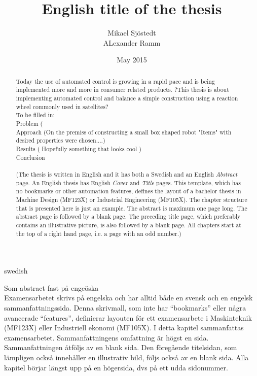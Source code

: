 \documentclass[a4paper,11pt]{kth-mag}
\title{English title of the thesis}
\author{Mikael Sjöstedt \\ ALexander Ramm}
\date{May 2015}
\begin{document}
%
\clearpage

\frontmatter
\pagestyle{plain}
{}
\maketitle
{}
\begin{abstract}
Today the use of automated control is growing in a rapid pace and is being implemented more and more in consumer related products. ?This thesis is about implementing automated control and balance a simple construction using a reaction wheel commonly used in satellites? 
\\ To be filled in:
\\Problem ( 
\\Approach (On the premiss of constructing a small box shaped robot "Items" with desired properties were chosen....)
\\Results ( Hopefully something that looks cool ) 
\\ Conclusion
\\ \\
(The thesis is written in English and it has both a Swedish and an English \textit{Abstract} page. An English thesis has English \textit{Cover} and \textit{Title} pages. This template, which has no bookmarks or other automation features, defines the layout of a bachelor thesis in Machine Design (MF123X) or Industrial Engineering (MF105X).  The chapter structure that is presented here is just an example.
The abstract is maximum one page long. The abstract page is followed by a blank page. The preceding title page, which preferably contains an illustrative picture, is also followed by a blank page. All chapters start at the top of a right hand page, i.e. a page with an odd number.)
\end{abstract}
\cleardoublepage
\begin{foreignabstract}{swedish}
Som abstract fast på engeöska
\\
Examensarbetet skrivs på engelska och har alltid både en svensk och en engelsk sammanfattningssida. Denna skrivmall, som inte har ``bookmarks'' eller några avancerade ``features'', definierar layouten för ett examensarbete i Maskinteknik (MF123X) eller Industriell ekonomi (MF105X).
I detta kapitel sammanfattas examensarbetet. Sammanfattningens omfattning är högst en sida. Sammanfattningen åtföljs av en blank sida. Den föregående titelsidan, som lämpligen också innehåller en illustrativ bild, följs också av en blank sida. Alla kapitel börjar längst upp på en högersida, dvs på ett udda sidonummer.
\end{foreignabstract}
\clearpage
\end{document}
